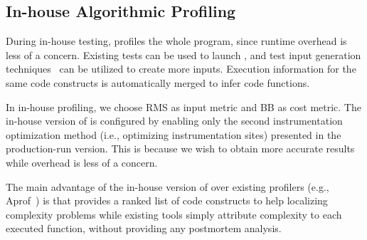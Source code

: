 \subsection{In-house Algorithmic Profiling}
\label{sec:in-house}

During in-house testing, \Tool profiles the whole program, 
since runtime overhead is less of a concern. 
Existing tests can be used to launch \Tool, 
and test input generation techniques~\cite{KLEE,dart,s2e} 
can be utilized to create more inputs.
Execution information for the same code constructs 
is automatically merged to infer code functions. 




In in-house profiling, we choose RMS as input metric 
and BB as cost  metric.  
The in-house version of \Tool is configured by enabling
only the second instrumentation optimization method (i.e.,
optimizing instrumentation sites) presented 
in the production-run version. This is because we wish 
to obtain more accurate results while overhead is less of 
a concern.  

The main advantage of the in-house version of \Tool 
over existing profilers (e.g., Aprof~\cite{Aprof1,Aprof2}) is that 
\Tool provides a ranked list of code constructs to
help localizing complexity problems while 
existing tools simply attribute complexity to each executed function, 
without providing any postmortem analysis. 




